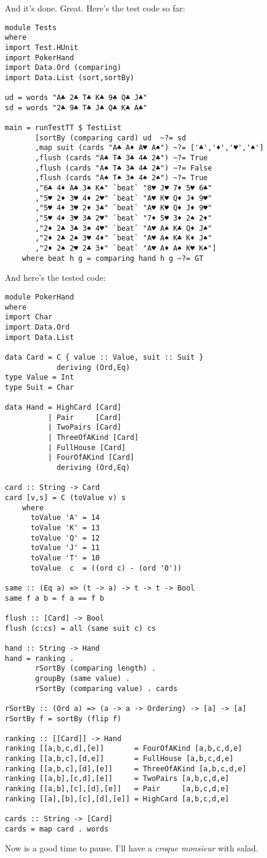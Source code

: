 \success And it's done.
\newpage
\lhN Great. Here's the test code so far:
\begin{lstlisting}[frame=single]
module Tests
where 
import Test.HUnit
import PokerHand
import Data.Ord (comparing)
import Data.List (sort,sortBy)

ud = words "A♣ 2♣ T♣ K♣ 9♣ Q♣ J♣"
sd = words "2♣ 9♣ T♣ J♣ Q♣ K♣ A♣"

main = runTestTT $ TestList 
       [sortBy (comparing card) ud  ~?= sd
       ,map suit (cards "A♣ A♦ A♥ A♠") ~?= ['♣','♦','♥','♠']
       ,flush (cards "A♣ T♣ 3♣ 4♣ 2♣") ~?= True
       ,flush (cards "A♠ T♣ 3♣ 4♣ 2♣") ~?= False
       ,flush (cards "A♠ T♠ 3♠ 4♠ 2♠") ~?= True
       ,"6♣ 4♦ A♣ 3♠ K♠" `beat` "8♥ J♥ 7♦ 5♥ 6♣"
       ,"5♥ 2♦ 3♥ 4♦ 2♥" `beat` "A♥ K♥ Q♦ J♦ 9♥"
       ,"5♥ 4♦ 3♥ 2♦ 3♣" `beat` "A♥ K♥ Q♦ J♦ 9♥"
       ,"5♥ 4♦ 3♥ 3♣ 2♥" `beat` "7♦ 5♥ 3♦ 2♠ 2♦"
       ,"2♦ 2♣ 3♣ 3♠ 4♥" `beat` "A♥ A♠ K♣ Q♦ J♠"  
       ,"2♦ 2♣ 2♠ 3♥ 4♦" `beat` "A♥ A♠ K♣ K♦ J♠"
       ,"2♦ 2♠ 2♥ 2♣ 3♦" `beat` "A♥ A♦ A♠ K♥ K♠"]
    where beat h g = comparing hand h g ~?= GT
\end{lstlisting} %
\lhA And here's the tested code:
\begin{lstlisting}[frame=single]
module PokerHand
where
import Char
import Data.Ord
import Data.List

data Card = C { value :: Value, suit :: Suit } 
            deriving (Ord,Eq)
type Value = Int
type Suit = Char

data Hand = HighCard [Card]
          | Pair     [Card]
          | TwoPairs [Card]
          | ThreeOfAKind [Card]
          | FullHouse [Card]
          | FourOfAKind [Card]
            deriving (Ord,Eq)

card :: String -> Card
card [v,s] = C (toValue v) s
    where 
      toValue 'A' = 14
      toValue 'K' = 13
      toValue 'Q' = 12
      toValue 'J' = 11
      toValue 'T' = 10
      toValue  c  = ((ord c) - (ord '0'))

same :: (Eq a) => (t -> a) -> t -> t -> Bool
same f a b = f a == f b

flush :: [Card] -> Bool
flush (c:cs) = all (same suit c) cs

hand :: String -> Hand
hand = ranking . 
       rSortBy (comparing length) .
       groupBy (same value) . 
       rSortBy (comparing value) . cards

rSortBy :: (Ord a) => (a -> a -> Ordering) -> [a] -> [a]
rSortBy f = sortBy (flip f)

ranking :: [[Card]] -> Hand
ranking [[a,b,c,d],[e]]       = FourOfAKind [a,b,c,d,e]
ranking [[a,b,c],[d,e]]       = FullHouse [a,b,c,d,e]
ranking [[a,b,c],[d],[e]]     = ThreeOfAKind [a,b,c,d,e]
ranking [[a,b],[c,d],[e]]     = TwoPairs [a,b,c,d,e]
ranking [[a,b],[c],[d],[e]]   = Pair     [a,b,c,d,e]
ranking [[a],[b],[c],[d],[e]] = HighCard [a,b,c,d,e] 

cards :: String -> [Card]
cards = map card . words 
\end{lstlisting}
\lhN Now is a good time to pause.
\lhA I'll have a \emph{croque monsieur} with salad.
\lhend


